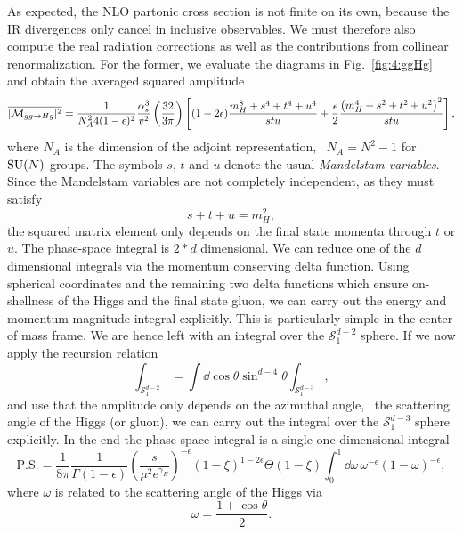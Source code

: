 As expected, the \acs{NLO} partonic cross section is not finite on its own, because the \acs{IR} divergences only cancel in inclusive observables. We must therefore also compute the real radiation corrections as well as the contributions from collinear renormalization. For the former, we evaluate the diagrams in Fig.~\ref{fig:4:ggHg} and obtain the averaged squared amplitude
\begin{equation}
\overline{|\mathcal{M}_{gg \rightarrow H g}|^2} = \frac{1}{N_A^2 4 (1 - \epsilon)^2} \frac{\alpha_s^3}{v^2} \left(\frac{32}{3 \pi} \right) \left[ (1 - 2 \epsilon) \frac{m_H^8 + s^4 + t^4 + u^4}{stu} + \frac{\epsilon}{2} \frac{\left(m_H^4 + s^2 + t^2 + u^2 \right)^2}{stu} \right],
\label{eq:4:ggHg_Amp}
\end{equation}
where $N_A$ is the dimension of the adjoint representation, \ie\ $N_A = N^2 - 1$ for $\mathrm{SU}(N)$ groups. The symbols $s$, $t$ and $u$ denote the usual \textit{Mandelstam variables}. Since the Mandelstam variables are not completely independent, as they must satisfy
\begin{equation}
  s + t + u = m_H^2,
\end{equation}
the squared matrix element only depends on the final state momenta through $t$ or $u$. The phase-space integral is $2*d$ dimensional. We can reduce one of the $d$ dimensional integrals via the momentum conserving delta function. Using spherical coordinates and the remaining two delta functions which ensure on-shellness of the Higgs and the final state gluon, we can carry out the energy and momentum magnitude integral explicitly. This is particularly simple in the center of mass frame. We are hence left with an integral over the $\mathcal{S}_1^{d - 2}$ sphere. If we now apply the recursion relation
\begin{equation}
\int_{\mathcal{S}_1^{d - 2}} = \int \dd \cos \theta \sin^{d - 4} \theta \int_{\mathcal{S}_1^{d - 3}},
\end{equation}
and use that the amplitude only depends on the azimuthal angle, \ie\ the scattering angle of the Higgs (or gluon), we can carry out the integral over the $\mathcal{S}_1^{d - 3}$ sphere explicitly. In the end the phase-space integral is a single one-dimensional integral
\begin{equation}
\text{P.S.} = \frac{1}{8 \pi} \frac{1}{\Gamma (1 - \epsilon)} \left(\frac{s}{\mu^2 e^{\gamma_E}}\right)^{-\epsilon} \left(1 - \xi \right)^{1 - 2 \epsilon} \Theta (1 - \xi) \int_0^1 \dd \omega \, \omega^{-\epsilon} (1 - \omega)^{-\epsilon},
\end{equation}
where $\omega$ is related to the scattering angle of the Higgs via
\begin{equation}
\omega = \frac{1 + \cos \theta}{2}.
\end{equation}

